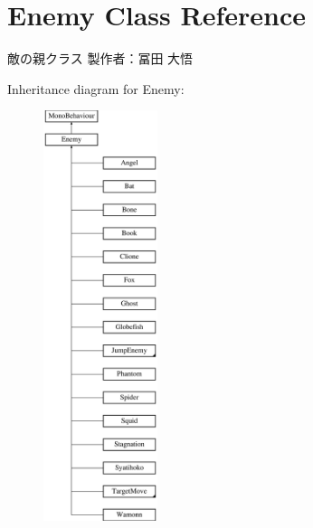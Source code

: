\hypertarget{class_enemy}{}\section{Enemy Class Reference}
\label{class_enemy}


敵の親クラス 製作者：冨田 大悟  


Inheritance diagram for Enemy\+:\begin{figure}[H]
\begin{center}
\leavevmode
\includegraphics[height=12.000000cm]{class_enemy}
\end{center}
\end{figure}
